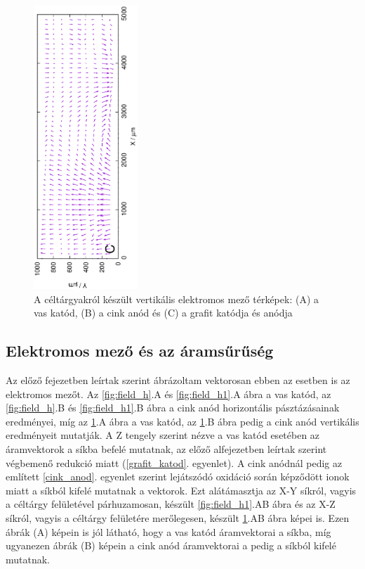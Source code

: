\begin{figure}
\includegraphics[width=0.35\textwidth, angle=-90]{img/mérések/grafit1_v.eps}

\caption{A céltárgyakról készült vertikális elektromos mező térképek:
(A) a vas katód, (B) a cink anód és (C) a grafit katódja és anódja}
\label{fig:field_v}
\end{figure}


\subsection{Elektromos mező és az áramsűrűség}

Az előző fejezetben leírtak szerint ábrázoltam vektorosan ebben az esetben is az elektromos mezőt. Az \ref{fig:field_h}.A és \ref{fig:field_h1}.A ábra a vas katód, az \ref{fig:field_h}.B és \ref{fig:field_h1}.B ábra a cink anód horizontális pásztázásainak eredményei, míg az \ref{fig:field_v}.A ábra a vas katód, az \ref{fig:field_v}.B ábra pedig a cink anód vertikális eredményeit mutatják. A Z tengely szerint nézve a vas katód esetében az áramvektorok a síkba befelé mutatnak, az előző alfejezetben leírtak szerint végbemenő redukció miatt (\ref{grafit_katod}. egyenlet). A cink anódnál pedig az említett \ref{cink_anod}. egyenlet szerint lejátszódó oxidáció során képződött ionok miatt a síkból kifelé mutatnak a vektorok. Ezt alátámasztja az X-Y síkról, vagyis a céltárgy felületével párhuzamosan, készült \ref{fig:field_h1}.AB ábra és az X-Z síkról, vagyis a céltárgy felületére merőlegesen, készült \ref{fig:field_v}.AB ábra képei is. Ezen ábrák (A) képein is jól látható, hogy a vas katód áramvektorai a síkba, míg ugyanezen ábrák (B) képein a cink anód áramvektorai a pedig a síkból kifelé mutatnak.

